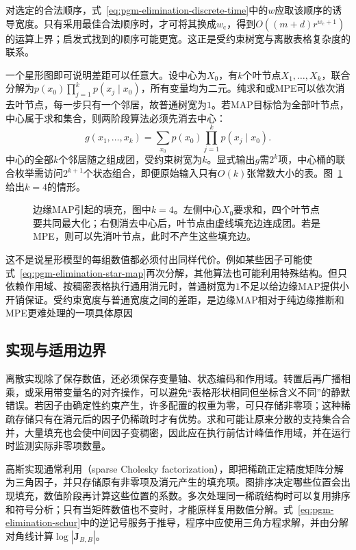 对选定的合法顺序，式~\eqref{eq:pgm-elimination-discrete-time}中的$w$应取该顺序的诱导宽度。只有采用最佳合法顺序时，才可将其换成$w_{\mathrm{c}}$，得到$O((m+d)r^{w_{\mathrm{c}}+1})$的运算上界；启发式找到的顺序可能更宽。这正是受约束树宽与离散表格复杂度的联系。

一个星形图即可说明差距可以任意大。设中心为$X_0$，有$k$个叶节点$X_1,\ldots,X_k$，联合分解为$p(x_0)\prod_{j=1}^k p(x_j\mid x_0)$，所有变量均为二元。纯求和或MPE可以依次消去叶节点，每一步只有一个邻居，故普通树宽为$1$。若MAP目标恰为全部叶节点，中心属于求和集合，则两阶段算法必须先消去中心：
\begin{equation}
  g(x_1,\ldots,x_k)
  =\sum_{x_0}p(x_0)\prod_{j=1}^{k}p(x_j\mid x_0).
  \label{eq:pgm-elimination-star-map}
\end{equation}
中心的全部$k$个邻居随之组成团，受约束树宽为$k$。显式输出$g$需$2^k$项，中心桶的联合枚举需访问$2^{k+1}$个状态组合，即便原始输入只有$O(k)$张常数大小的表。图~\ref{fig:pgm-elimination-constrained-star}给出$k=4$的情形。

\begin{figure}[htbp]
  \centering
  
  \caption{边缘MAP引起的填充，图中$k=4$。左侧中心$X_0$要求和，四个叶节点要共同最大化；右侧消去中心后，叶节点由虚线填充边连成团。若是MPE，则可以先消叶节点，此时不产生这些填充边。}
  \label{fig:pgm-elimination-constrained-star}
\end{figure}

这不是说星形模型的每组数值都必须付出同样代价。例如某些因子可能使式~\eqref{eq:pgm-elimination-star-map}再次分解，其他算法也可能利用特殊结构。但只依赖作用域、按稠密表格执行通用消元时，普通树宽为$1$不足以给边缘MAP提供小开销保证。受约束宽度与普通宽度之间的差距，是边缘MAP相对于纯边缘推断和MPE更难处理的一项具体原因

\subsection{实现与适用边界}
\label{sec:pgm-elimination-implementation}

离散实现除了保存数值，还必须保存变量轴、状态编码和作用域。转置后再广播相乘，或采用带变量名的对齐操作，可以避免“表格形状相同但坐标含义不同”的静默错误。若因子由确定性约束产生，许多配置的权重为零，可只存储非零项；这种稀疏存储只有在消元后的因子仍稀疏时才有优势。求和可能让原来分散的支持集合合并，大量填充也会使中间因子变稠密，因此应在执行前估计峰值作用域，并在运行时监测实际非零项数量。

高斯实现通常利用（sparse Cholesky factorization），即把稀疏正定精度矩阵分解为三角因子，并只存储原有非零项及消元产生的填充项。图排序决定哪些位置会出现填充，数值阶段再计算这些位置的系数。多次处理同一稀疏结构时可以复用排序和符号分析；只有当矩阵数值也不变时，才能原样复用数值分解。式~\eqref{eq:pgm-elimination-schur}中的逆记号服务于推导，程序中应使用三角方程求解，并由分解对角线计算$\log|\bm{J}_{B,B}|$。

